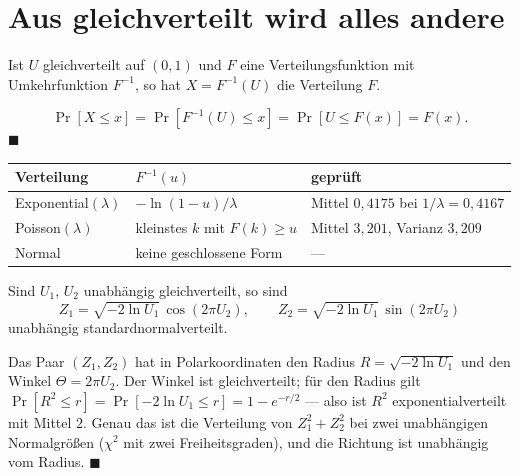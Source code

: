 \section{Aus gleichverteilt wird alles andere}

\begin{merksatz}
Ist $U$ gleichverteilt auf $(0,1)$ und $F$ eine Verteilungsfunktion mit Umkehrfunktion $F^{-1}$, so hat $X = F^{-1}(U)$ die Verteilung $F$.

\[ \Pr[X \le x] = \Pr[F^{-1}(U) \le x] = \Pr[U \le F(x)] = F(x) . \]
$\blacksquare$

\begin{center}
{\small
\renewcommand{\arraystretch}{1.5}
\begin{tabular}{@{}P{2.4cm}P{3.2cm}P{2.6cm}@{}}
\toprule
\textbf{Verteilung} & $F^{-1}(u)$ & \textbf{geprüft}\\
\midrule
Exponential$(\lambda)$ & $-\ln(1-u)/\lambda$ & Mittel $0{,}4175$ bei $1/\lambda = 0{,}4167$\\
Poisson$(\lambda)$ & kleinstes $k$ mit $F(k)\ge u$ & Mittel $3{,}201$, Varianz $3{,}209$\\
Normal & keine geschlossene Form & ---\\
\bottomrule
\end{tabular}}
\end{center}

\begin{center}
\begin{minipage}{0.88\textwidth}
\end{minipage}
\end{center}
\end{merksatz}

\begin{merksatz}
Sind $U_1$, $U_2$ unabhängig gleichverteilt, so sind
\[ Z_1 = \sqrt{-2\ln U_1}\,\cos(2\pi U_2), \qquad Z_2 = \sqrt{-2\ln U_1}\,\sin(2\pi U_2) \]
unabhängig standardnormalverteilt.

Das Paar $(Z_1,Z_2)$ hat in Polarkoordinaten den Radius $R = \sqrt{-2\ln U_1}$ und den Winkel $\Theta = 2\pi U_2$. Der Winkel ist gleichverteilt; für den Radius gilt $\Pr[R^{2} \le r] = \Pr[-2\ln U_1 \le r] = 1-e^{-r/2}$ --- also ist $R^{2}$ exponentialverteilt mit Mittel $2$. Genau das ist die Verteilung von $Z_1^{2}+Z_2^{2}$ bei zwei unabhängigen Normalgrößen ($\chi^{2}$ mit zwei Freiheitsgraden), und die Richtung ist unabhängig vom Radius. $\blacksquare$

\end{merksatz}

